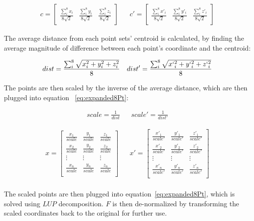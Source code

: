 \documentclass[12pt]{article}
\begin{document}
\begin{align}\label{eq:centroid}
    c =\begin{bmatrix}
        \frac{\sum_{i}^{8}x_i}{8\sqrt{2}} & \frac{\sum_{i}^{8}y_i}{8\sqrt{2}} & \frac{\sum_{i}^{8}z_i}{8\sqrt{2}}
    \end{bmatrix}
&&
    c' =\begin{bmatrix}
        \frac{\sum_{i}^{8}x'_i}{8\sqrt{2}} & \frac{\sum_{i}^{8}y'_i}{8\sqrt{2}} & \frac{\sum_{i}^{8}z'_i}{8\sqrt{2}}
    \end{bmatrix}
\end{align}

The average distance from each point sets' centroid is calculated, by finding the average magnitude of difference between each point's coordinate and the centroid:

\begin{align}\label{eq:avgDistance}
    dist = \frac{
        \sum_{i}^{8}
        \sqrt{x_i^{2}+y_i^{2}+z_i^{2}}
    }{8}
&&
    dist' = \frac{
        \sum_{i}^{8}
        \sqrt{x`_i^{2}+y`_i^{2}+z`_i^{2}}
    }{8}
\end{align}

The points are then scaled by the inverse of the average distance, which are then plugged into equation ~\eqref{eq:expanded8Pt}:

\begin{align}\label{eq:scale}
    scale = \frac{1}{dist}
&&
    scale' = \frac{1}{dist'}
\end{align}

\begin{align}\label{eq:pointsScaled}
    x = \begin{bmatrix}
        \frac{x_1}{scale} & \frac{y_1}{scale} & \frac{z_1}{scale}\\[0.3em]
        \frac{x_2}{scale} & \frac{y_2}{scale} & \frac{z_2}{scale}\\[0.3em]
        \vdots & \vdots & \vdots\\ 
        \frac{x_n}{scale} & \frac{y_n}{scale} & \frac{z_n}{scale}\\[0.3em]
    \end{bmatrix}
&&
    x' =
    \begin{bmatrix}
        \frac{x'_1}{scale'} & \frac{y'_1}{scale'} & \frac{z'_1}{scale'}\\[0.3em] 
        \frac{x'_2}{scale'} & \frac{y'_2}{scale'} & \frac{z'_2}{scale'}\\[0.3em]
        \vdots & \vdots & \vdots\\ 
        \frac{x'_n}{scale'} & \frac{y'_n}{scale'} & \frac{z'_n}{scale'}\\[0.3em]
    \end{bmatrix}
\end{align}
\\
The scaled points are then plugged into equation~\eqref{eq:expanded8Pt}, which is solved using $LUP$ decomposition. $F$ is then de-normalized by transforming the scaled coordinates back to the original for further use.
\end{document}
